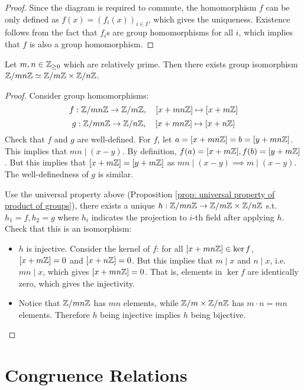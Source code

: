 \documentclass{article}
\begin{document}
\begin{proof}
    Since the diagram is required to commute, the homomorphism $f$ can be only defined as $f(x) = (f_i(x))_{i \in I}$, which gives the uniqueness. Existence follows from the fact that $f_i$s are group homomorphisms for all $i$, which implies that $f$ is also a group homomorphism.
\end{proof}

\begin{example}
    Let $m, n \in \mathbb{Z}_{\geq 0}$ which are relatively prime. Then there exists group isomorphism $\mathbb{Z}/mn\mathbb{Z} \simeq \mathbb{Z}/m\mathbb{Z} \times \mathbb{Z}/n\mathbb{Z}$.
\end{example}

\begin{proof}
    Consider group homomorphisms: 
    \[
        f: \mathbb{Z}/mn\mathbb{Z} \to \mathbb{Z}/m\mathbb{Z}, \quad [x + mn\mathbb{Z}] \mapsto [x + m\mathbb{Z}]
    \]
    \[
        g: \mathbb{Z}/mn\mathbb{Z} \to \mathbb{Z}/n\mathbb{Z}, \quad [x + mn\mathbb{Z}] \mapsto [x + n\mathbb{Z}]
    \]
    Check that $f$ and $g$ are well-defined. For $f$, let $a = [x + mn\mathbb{Z}] = b = [y + mn\mathbb{Z}]$. This implies that $mn \mid (x - y)$. By definition, $f(a) = [x + m\mathbb{Z}], f(b) = [y + m\mathbb{Z}]$. But this implies that $[x + m\mathbb{Z}] = [y + m\mathbb{Z}]$ as $mn \mid (x - y) \implies m \mid (x - y)$. The well-definedness of $g$ is similar.

    Use the universal property above (Proposition \ref{prop: universal property of product of groups}), there exists a unique $h: \mathbb{Z}/mn\mathbb{Z} \to \mathbb{Z}/m\mathbb{Z} \times \mathbb{Z}/n\mathbb{Z}$ s.t. $h_1 = f, h_2 = g$ where $h_i$ indicates the projection to $i$-th field after applying $h$. Check that this is an isomorphism:
    \begin{itemize}
        \item $h$ is injective. Consider the kernel of $f$: for all $[x + mn\mathbb{Z}] \in \ker f$, $[x + m\mathbb{Z}] = 0$ and $[x + n\mathbb{Z}] = 0$. But this implies that $m \mid x$ and $n \mid x$, i.e. $mn \mid x$, which gives $[x + mn\mathbb{Z}] = 0$. That is, elements in $\ker f$ are identically zero, which gives the injectivity.
        \item Notice that $\mathbb{Z}/mn\mathbb{Z}$ has $mn$ elements, while $\mathbb{Z}/m \times \mathbb{Z}/n\mathbb{Z}$ has $m \cdot n = mn$ elements. Therefore $h$ being injective implies $h$ being bijective. 
    \end{itemize}
\end{proof}

\section{Congruence Relations}
\end{document}
